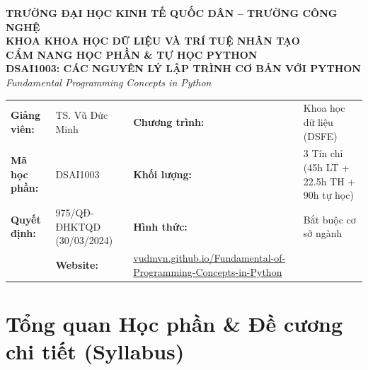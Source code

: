 \documentclass[11pt,a4paper]{article}
\begin{document}
\begin{tcolorbox}[
    enhanced,
    colback=primaryblue,
    colframe=primaryblue,
    arc=5pt,
    boxrule=0pt,
    top=6mm, bottom=6mm, left=6mm, right=6mm
]
\begin{center}
    {\color{white}\large\textbf{TRƯỜNG ĐẠI HỌC KINH TẾ QUỐC DÂN -- TRƯỜNG CÔNG NGHỆ}}\\[1mm]
    {\color{white}\small\textbf{KHOA KHOA HỌC DỮ LIỆU VÀ TRÍ TUỆ NHÂN TẠO}}\\[4mm]
    {\color{white}\Huge\textbf{CẨM NANG HỌC PHẦN \& TỰ HỌC PYTHON}}\\[2mm]
    {\color{accentgold}\Large\textbf{DSAI1003: CÁC NGUYÊN LÝ LẬP TRÌNH CƠ BẢN VỚI PYTHON}}\\[1mm]
    {\color{white!80}\small\textit{Fundamental Programming Concepts in Python}}
\end{center}
\end{tcolorbox}

\vspace{2mm}

\begin{tcolorbox}[
    enhanced,
    colback=white,
    colframe=borderblue,
    arc=4pt,
    boxrule=1pt,
    top=3mm, bottom=3mm, left=4mm, right=4mm
]
\begin{tabularx}{\textwidth}{@{}lXlX@{}}
    \textbf{Giảng viên:} & TS. Vũ Đức Minh & \textbf{Chương trình:} & Khoa học dữ liệu (DSFE) \\
    \textbf{Mã học phần:} & DSAI1003 & \textbf{Khối lượng:} & 3 Tín chỉ (45h LT + 22.5h TH + 90h tự học) \\
    \textbf{Quyết định:} & 975/QĐ-ĐHKTQD (30/03/2024) & \textbf{Hình thức:} & Bắt buộc cơ sở ngành \\
    & \textbf{Website:} & \href{https://vudmvn.github.io/Fundamental-of-Programming-Concepts-in-Python/}{vudmvn.github.io/Fundamental-of-Programming-Concepts-in-Python} \\
\end{tabularx}
\end{tcolorbox}

\vspace{3mm}

\tableofcontents

\vspace{5mm}

\section{Tổng quan Học phần \& Đề cương chi tiết (Syllabus)}
\end{document}

